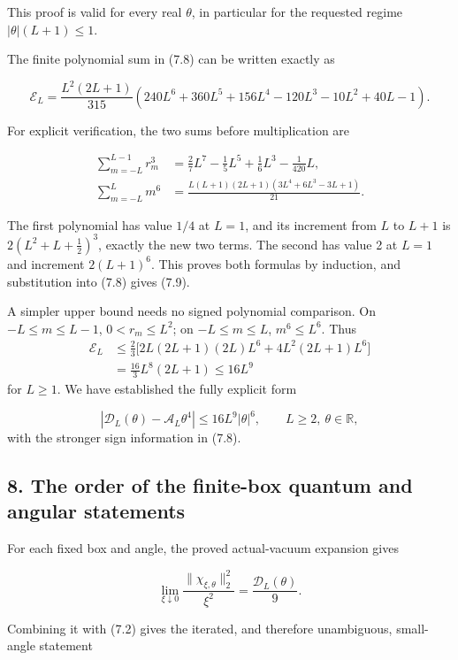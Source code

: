 \documentclass[
  11pt,
]{article}
\begin{document}
This proof is valid for every real \(\theta\), in particular for the
requested regime \(|\theta|(L+1)\le1\).

The finite polynomial sum in (7.8) can be written exactly as

\[
\mathcal E_L=
\frac{L^2(2L+1)}{315}
(240L^6+360L^5+156L^4-120L^3-10L^2+40L-1).
\tag{7.9}
\]

For explicit verification, the two sums before multiplication are

\[
\begin{split}
\sum_{m=-L}^{L-1}r_m^3
&=\frac27L^7-\frac15L^5+\frac16L^3-\frac1{420}L,\\
\sum_{m=-L}^{L}m^6
&=\frac{L(L+1)(2L+1)(3L^4+6L^3-3L+1)}{21}.
\end{split}
\tag{7.10}
\]

The first polynomial has value \(1/4\) at \(L=1\), and its increment
from \(L\) to \(L+1\) is \(2(L^2+L+\tfrac12)^3\), exactly the new two
terms. The second has value 2 at \(L=1\) and increment \(2(L+1)^6\).
This proves both formulas by induction, and substitution into (7.8)
gives (7.9).

A simpler upper bound needs no signed polynomial comparison. On
\(-L\le m\le L-1\), \(0<r_m\le L^2\); on \(-L\le m\le L\),
\(m^6\le L^6\). Thus \[
\begin{split}
\mathcal E_L
&\le\frac23\big[2L(2L+1)(2L)L^6+
4L^2(2L+1)L^6\big]\\
&=\frac{16}{3}L^8(2L+1)\le16L^9
\end{split}
\] for \(L\ge1\). We have established the fully explicit form

\[
\boxed{|\mathcal D_L(\theta)-\mathcal A_L\theta^4|
\le16L^9|\theta|^6,\qquad L\ge2,\ \theta\in\mathbb R,}
\tag{7.11}
\] with the stronger sign information in (7.8).

\subsection{8. The order of the finite-box quantum and angular
statements}\label{magnetic-part-2-the-order-of-the-finite-box-quantum-and-angular-statements}

For each fixed box and angle, the proved actual-vacuum expansion gives

\[
\lim_{\xi\downarrow0}\frac{\|\chi_{\xi,\theta}\|_2^2}{\xi^2}
=\frac{\mathcal D_L(\theta)}9.
\tag{8.1}
\]

Combining it with (7.2) gives the iterated, and therefore unambiguous,
small-angle statement
\end{document}
